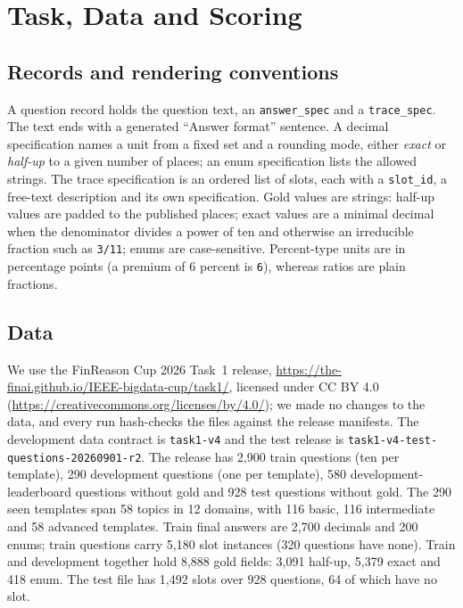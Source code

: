\documentclass[conference]{IEEEtran}
\newcommand{\id}[1]{\texttt{#1}}
\begin{document}
\section{Task, Data and Scoring}\label{sec:task}

\subsection{Records and rendering conventions}
A question record holds the question text, an \id{answer\_spec} and a \id{trace\_spec}. The text ends with a generated ``Answer format'' sentence. A decimal specification names a unit from a fixed set and a rounding mode, either \emph{exact} or \emph{half-up} to a given number of places; an enum specification lists the allowed strings. The trace specification is an ordered list of slots, each with a \id{slot\_id}, a free-text description and its own specification. Gold values are strings: half-up values are padded to the published places; exact values are a minimal decimal when the denominator divides a power of ten and otherwise an irreducible fraction such as \id{3/11}; enums are case-sensitive. Percent-type units are in percentage points (a premium of 6 percent is \id{6}), whereas ratios are plain fractions.

\subsection{Data}
We use the FinReason Cup 2026 Task~1 release, \url{https://the-finai.github.io/IEEE-bigdata-cup/task1/}, licensed under CC BY 4.0 (\url{https://creativecommons.org/licenses/by/4.0/}); we made no changes to the data, and every run hash-checks the files against the release manifests. The development data contract is \id{task1-v4} and the test release is \id{task1-v4-test-questions-20260901-r2}. The release has 2,900 train questions (ten per template), 290 development questions (one per template), 580 development-leaderboard questions without gold and 928 test questions without gold. The 290 seen templates span 58 topics in 12 domains, with 116 basic, 116 intermediate and 58 advanced templates. Train final answers are 2,700 decimals and 200 enums; train questions carry 5,180 slot instances (320 questions have none). Train and development together hold 8,888 gold fields: 3,091 half-up, 5,379 exact and 418 enum. The test file has 1,492 slots over 928 questions, 64 of which have no slot.
\end{document}
